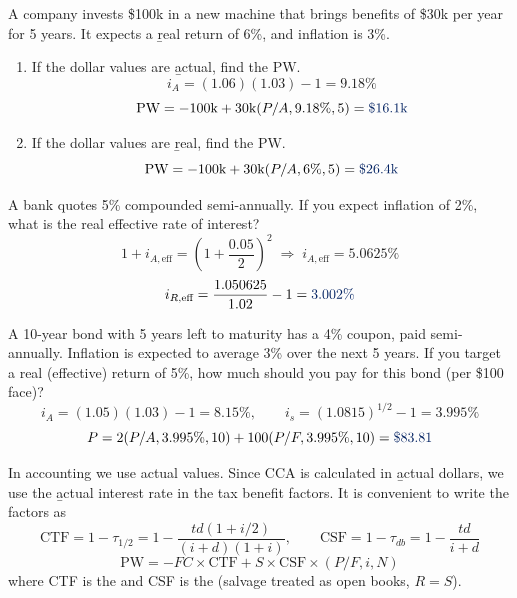 
\begin{example}
    A company invests \$100k in a new machine that brings benefits of \$30k
    per year for 5 years. It expects a \b{real} return of 6\%, and inflation
    is 3\%.
    \begin{enumerate}[label = \alph*)]
        \item If the dollar values are \b{actual}, find the PW.
        \\
        \[i_A = (1.06)(1.03) - 1 = 9.18\%\]
        \[\text{PW} = -100\text{k} + 30\text{k}(P/A,9.18\%,5) = \db{\$16.1\text{k}}\]
        \item If the dollar values are \b{real}, find the PW.
        \[\text{PW} = -100\text{k} + 30\text{k}(P/A,6\%,5) = \db{\$26.4\text{k}}\]
    \end{enumerate}
\end{example}

\begin{example}
    A bank quotes 5\% compounded semi-annually. If you expect inflation of
    2\%, what is the real effective rate of interest?
    \[1 + i_{A,\text{eff}} = \left(1 + \frac{0.05}{2}\right)^2 \;\Rightarrow\; i_{A,\text{eff}} = 5.0625\%\]
    \[i_{R,\text{eff}} = \frac{1.050625}{1.02} - 1 = \db{3.002\%}\]
\end{example}

\begin{example}
    A 10-year bond with 5 years left to maturity has a 4\% coupon, paid
    semi-annually. Inflation is expected to average 3\% over the next 5
    years. If you target a real (effective) return of 5\%, how much should
    you pay for this bond (per \$100 face)?
    \\
    \[i_A = (1.05)(1.03) - 1 = 8.15\%, \qquad i_s = (1.0815)^{1/2} - 1 = 3.995\%\]
    \[P = 2(P/A,3.995\%,10) + 100(P/F,3.995\%,10) = \db{\$83.81}\]
\end{example}

In accounting we use actual values. Since CCA is calculated in \b{actual}
dollars, we  use the \b{actual} interest rate in the tax benefit
factors. It is convenient to write the factors as
\[\boxed{\text{CTF} = 1 - \tau_{1/2} = 1 - \frac{td(1 + i/2)}{(i + d)(1 + i)}, \qquad \text{CSF} = 1 - \tau_{db} = 1 - \frac{td}{i + d}}\]
\[\text{PW} = -FC \times \text{CTF} + S \times \text{CSF} \times (P/F,i,N)\]
where CTF is the  and CSF is the  (salvage treated as open books, $R = S$).

